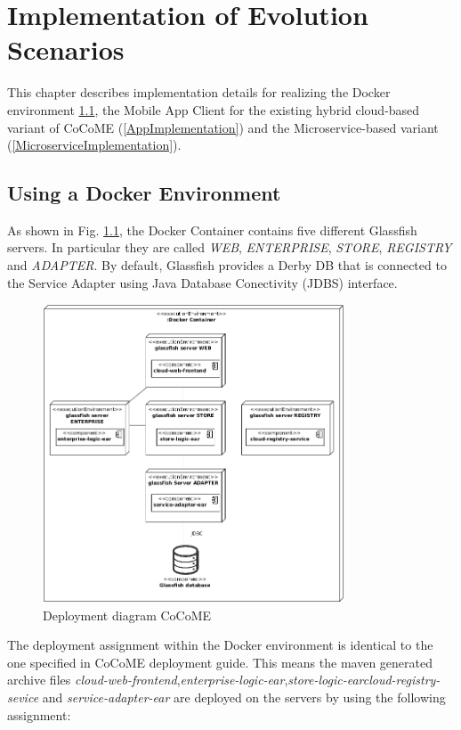 \chapter{Implementation of Evolution Scenarios}
This chapter describes implementation details for realizing the Docker environment \ref{DockerImplementation}, the Mobile App Client  for the existing hybrid cloud-based variant of CoCoME (\ref{AppImplementation}) and the Microservice-based variant (\ref{MicroserviceImplementation}).


\section{Using a Docker Environment}\label{DockerImplementation}
 	As shown in Fig. \ref*{Deploym_CoCoME}, the Docker Container contains five different Glassfish servers. In particular they are called \textit{WEB}, \textit{ENTERPRISE}, \textit{STORE}, \textit{REGISTRY} and \textit{ADAPTER}. By default, Glassfish provides a Derby DB that is connected to the Service Adapter using Java Database Conectivity (JDBS) interface.
 	\begin{figure}[h]
 		\centering
 		\includegraphics[width = 0.8\textwidth]{img/docker_Container_Deployment.png}
 		\caption{Deployment diagram CoCoME}
 		\label{Deploym_CoCoME}
 	\end{figure}
 	\noindent
 	The deployment assignment within the Docker environment is identical to the one specified in CoCoME deployment guide.
 	This means the maven generated archive files \textit{cloud-web-frontend},\textit{enterprise-logic-ear},\textit{store-logic-ear}\textit{cloud-registry-sevice} and \textit{service-adapter-ear} are deployed on the servers by using the following assignment:

